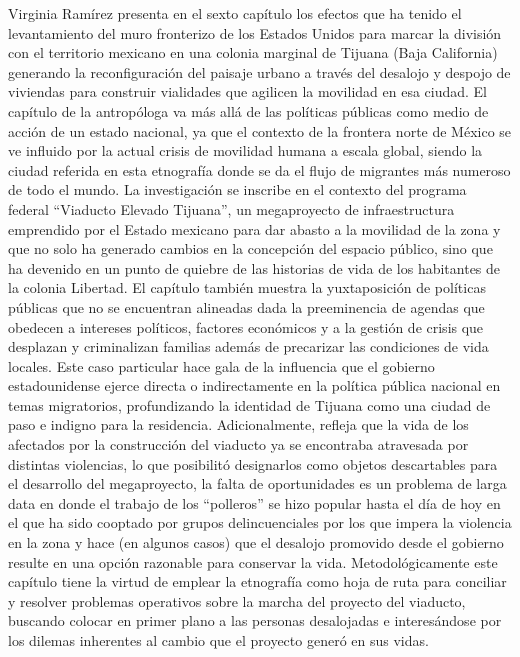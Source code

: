 \documentclass[
  spanish,
  11.5pt,
  170mm x 240mmpaper,
]{scrbook}
\begin{document}
Virginia Ramírez presenta en el sexto capítulo los efectos que ha tenido
el levantamiento del muro fronterizo de los Estados Unidos para marcar
la división con el territorio mexicano en una colonia marginal de
Tijuana (Baja California) generando la reconfiguración del paisaje
urbano a través del desalojo y despojo de viviendas para construir
vialidades que agilicen la movilidad en esa ciudad. El capítulo de la
antropóloga va más allá de las políticas públicas como medio de acción
de un estado nacional, ya que el contexto de la frontera norte de México
se ve influido por la actual crisis de movilidad humana a escala global,
siendo la ciudad referida en esta etnografía donde se da el flujo de
migrantes más numeroso de todo el mundo. La investigación se inscribe en
el contexto del programa federal ``Viaducto Elevado Tijuana'', un
megaproyecto de infraestructura emprendido por el Estado mexicano para
dar abasto a la movilidad de la zona y que no solo ha generado cambios
en la concepción del espacio público, sino que ha devenido en un punto
de quiebre de las historias de vida de los habitantes de la colonia
Libertad. El capítulo también muestra la yuxtaposición de políticas
públicas que no se encuentran alineadas dada la preeminencia de agendas
que obedecen a intereses políticos, factores económicos y a la gestión
de crisis que desplazan y criminalizan familias además de precarizar las
condiciones de vida locales. Este caso particular hace gala de la
influencia que el gobierno estadounidense ejerce directa o
indirectamente en la política pública nacional en temas migratorios,
profundizando la identidad de Tijuana como una ciudad de paso e indigno
para la residencia. Adicionalmente, refleja que la vida de los afectados
por la construcción del viaducto ya se encontraba atravesada por
distintas violencias, lo que posibilitó designarlos como objetos
descartables para el desarrollo del megaproyecto, la falta de
oportunidades es un problema de larga data en donde el trabajo de los
``polleros'' se hizo popular hasta el día de hoy en el que ha sido
cooptado por grupos delincuenciales por los que impera la violencia en
la zona y hace (en algunos casos) que el desalojo promovido desde el
gobierno resulte en una opción razonable para conservar la vida.
Metodológicamente este capítulo tiene la virtud de emplear la etnografía
como hoja de ruta para conciliar y resolver problemas operativos sobre
la marcha del proyecto del viaducto, buscando colocar en primer plano a
las personas desalojadas e interesándose por los dilemas inherentes al
cambio que el proyecto generó en sus vidas.
\end{document}
